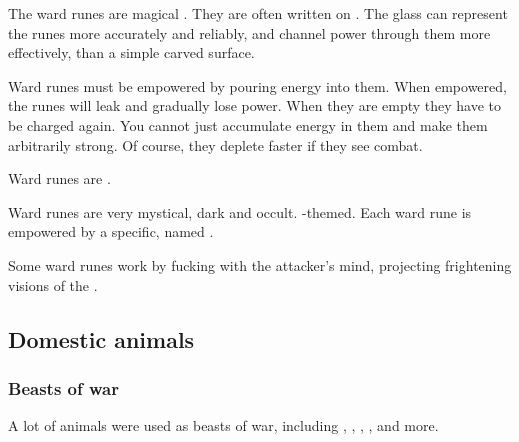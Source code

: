 The ward runes are magical  . 
They are often written on . 
The glass can represent the runes more accurately and reliably, and channel power through them more effectively, than a simple carved surface. 

Ward runes must be empowered by pouring energy into them. 
When empowered, the runes will leak and gradually lose power. 
When they are empty they have to be charged again. 
You cannot just accumulate energy in them and make them arbitrarily strong. 
Of course, they deplete faster if they see combat. 

Ward runes are . 

Ward runes are very mystical, dark and occult. 
\XzaiShann-themed. 
Each ward rune is empowered by a specific, named \xs. 


Some \xs ward runes work by fucking with the attacker's mind, projecting frightening visions of the \xs.










\subsection{Domestic animals}





\subsubsection{Beasts of war}
A lot of animals were used as beasts of war, including , , , ,   and more. 









